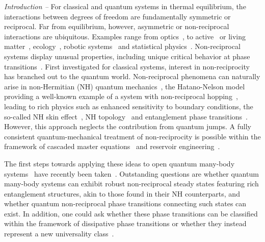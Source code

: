 \documentclass[floatfix,reprint,amsmath,amssymb,superscriptaddress,aps,prl]{revtex4-2}
\begin{document}
\emph{Introduction -- } For classical and quantum systems in thermal equilibrium, the interactions between degrees of freedom are fundamentally symmetric or reciprocal. Far from equilibrium, however, asymmetric or non-reciprocal interactions are ubiquitous. Examples range from optics~\cite{caloz2018whatis,sounas2017nonreciprocal}, to active~\cite{zhihong2020nonreciprocity,saha2020scalar,poncet2022when,brauns2024nonreciprocal} or living matter~\cite{Tan_2022_livingmatter}, ecology~\cite{ros2023generalized,blumenthal2024phase}, robotic systems~\cite{Brandenbourger_2019_robotics} and statistical physics~\cite{lorenzana2024nonreciprocalspinglasstransitionaging,hanai2024nonreciprocal,avni2025nonreciprocal,young2024nonequilibriumuniversalitynonreciprocallycoupled}. Non-reciprocal systems display unusual properties, including unique critical behavior at phase transitions~\cite{fruchart2021nonreciprocal}. First investigated for classical systems, interest in non-reciprocity has branched out to the quantum world. Non-reciprocal phenomena can naturally arise in non-Hermitian (NH) quantum mechanics~\cite{ashida2020review}, the Hatano-Nelson model providing a well-known example of a system with  non-reciprocal hopping~\cite{hatano1996localization,hatano1997vortex}, leading to rich physics such as enhanced sensitivity to boundary conditions, the so-called NH skin effect~\cite{lee2016anomalous,yao2018edge,sato2023nonhermitian}, NH topology~\cite{Gong_2018_nhtopology, kawabata2019symmetry} and entanglement phase transitions~\cite{kawabata2023entanglement}. However, this approach neglects the contribution from quantum jumps. A fully consistent quantum-mechanical treatment of non-reciprocity is possible within the framework of cascaded master equations~\cite{Gardiner_1993, carmichael1993quantum} and reservoir engineering~\cite{metelman2015nonreciprocal,clerk2022introduction}.

The first steps towards applying these ideas to open quantum many-body systems~\cite{fazio2025manybodyopenquantumsystems} have recently been taken~\cite{keck2018persistent,hanai2019nonhermitian,Song2019ChiralDamping,yang2022liouvillian,McDonald2022NonEq,chiacchio2023nonreciprocal,Begg2024,brighi2024nonreciprocal,nadolny2024nonreciprocalsynchronizationactivequantum, Nadolny_2025_laser, zelle2024universal,belyansky2025phasetransitionsnonreciprocaldrivendissipative}. Outstanding questions are whether quantum many-body systems can exhibit robust non-reciprocal steady states featuring rich entanglement structures, akin to those found in their NH counterparts, and whether quantum non-reciprocal phase transitions connecting such states can exist. In addition, one could ask whether these phase transitions can be classified within the framework of dissipative phase transitions or whether they instead represent a new universality class~\cite{sieberer2023universalitydrivenopenquantum}.
\end{document}
